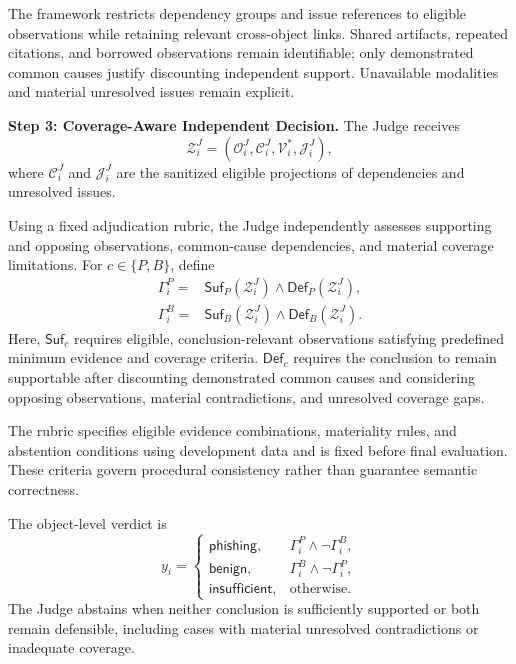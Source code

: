 The framework restricts dependency
groups and issue references to
eligible observations while
retaining relevant cross-object
links. Shared artifacts, repeated
citations, and borrowed observations
remain identifiable; only
demonstrated common causes justify
discounting independent support.
Unavailable modalities and material
unresolved issues remain explicit.

\medskip
\noindent\textbf{Step 3: Coverage-Aware
Independent Decision.}
The Judge receives
\begin{equation}
\mathcal Z_i^J=
(\mathcal O_i^J,\mathcal C_i^J,
\mathcal V_i^*,\mathcal J_i^J),
\label{eq:judge-context}
\end{equation}
where $\mathcal C_i^J$ and
$\mathcal J_i^J$ are the sanitized
eligible projections of dependencies
and unresolved issues.

Using a fixed adjudication rubric,
the Judge independently assesses
supporting and opposing observations,
common-cause dependencies, and
material coverage limitations.
For $c\in\{P,B\}$, define
\begin{equation}
\begin{aligned}
\Gamma_i^P={}&
\mathsf{Suf}_{P}(\mathcal Z_i^J)
\land\mathsf{Def}_{P}(\mathcal Z_i^J),\\
\Gamma_i^B={}&
\mathsf{Suf}_{B}(\mathcal Z_i^J)
\land\mathsf{Def}_{B}(\mathcal Z_i^J).
\end{aligned}
\label{eq:judge-conditions}
\end{equation}
Here, $\mathsf{Suf}_c$ requires
eligible, conclusion-relevant
observations satisfying predefined
minimum evidence and coverage
criteria. $\mathsf{Def}_c$ requires
the conclusion to remain supportable
after discounting demonstrated
common causes and considering
opposing observations, material
contradictions, and unresolved
coverage gaps.

The rubric specifies eligible
evidence combinations, materiality
rules, and abstention conditions
using development data and is
fixed before final evaluation.
These criteria govern procedural
consistency rather than guarantee
semantic correctness.

The object-level verdict is
\begin{equation}
y_i=
\begin{cases}
\mathsf{phishing},
&\Gamma_i^P\land\neg\Gamma_i^B,\\
\mathsf{benign},
&\Gamma_i^B\land\neg\Gamma_i^P,\\
\mathsf{insufficient},
&\text{otherwise}.
\end{cases}
\label{eq:judge-decision}
\end{equation}
The Judge abstains when neither
conclusion is sufficiently supported
or both remain defensible, including
cases with material unresolved
contradictions or inadequate coverage.

